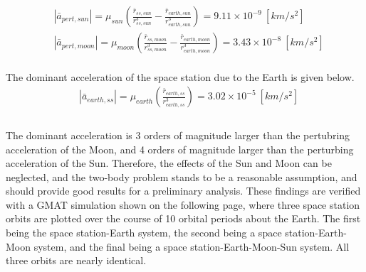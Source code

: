 \documentclass[a4paper]{article}
\begin{document}
\begin{equation}
	\begin{aligned}
		& |\bar{a}_{pert,sun}| = \mu_{sun}(\frac{\bar{r}_{ss,sun}}{r_{ss,sun}^3} - \frac{\bar{r}_{earth,sun}}{r_{earth,sun}^3}) =  9.11 \times 10^{-9} \ [km/s^2]\\
		& |\bar{a}_{pert,moon}|  = \mu_{moon}(\frac{\bar{r}_{ss,moon}}{r_{ss,moon}^3} - \frac{\bar{r}_{earth,moon}}{r_{earth,moon}^3})  = 3.43 \times 10^{-8} \ [km/s^2]
	\end{aligned}
\end{equation} 
\\
The dominant acceleration of the space station due to the Earth is given below.
\begin{equation}
	\begin{aligned}
		& |\bar{a}_{earth,ss}| = \mu_{earth}(\frac{\bar{r}_{earth,ss}}{r_{earth,ss}^3}) =  3.02 \times 10^{-5} \ [km/s^2]\\
	\end{aligned}
\end{equation} 
\\
The dominant acceleration is 3 orders of magnitude larger than the pertubring acceleration of the Moon, and 4 orders of magnitude larger than the perturbing acceleration of the Sun. Therefore, the effects of the Sun and Moon can be neglected, and the two-body problem stands to be a reasonable assumption, and should provide good results for a preliminary analysis. These findings are verified with a GMAT simulation shown on the following page, where three space station orbits are plotted over the course of 10 orbital periods about the Earth. The first being the space station-Earth system, the second being a space station-Earth-Moon system, and the final being a space station-Earth-Moon-Sun system. All three orbits are nearly identical. 
\end{document}
